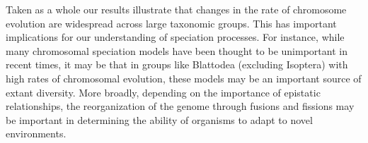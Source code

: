 Taken as a whole our results illustrate that changes in the rate of chromosome evolution are widespread across large taxonomic groups.
This has important implications for our understanding of speciation processes.
For instance, while many chromosomal speciation models \citep{baker1986, white} have been thought to be unimportant in recent times, it may be that in groups like Blattodea (excluding Isoptera) with high rates of chromosomal evolution, these models may be an important source of extant diversity.
More broadly, depending on the importance of epistatic relationships, the reorganization of the genome through fusions and fissions may be important in determining the ability of organisms to adapt to novel environments.
